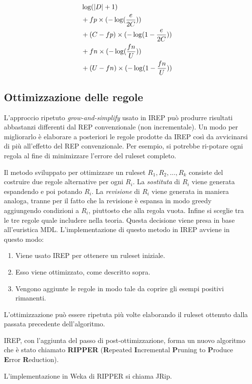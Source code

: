 \begin{align*}
	&\log(|D| + 1) \\
	&+ fp \times (-\log(\dfrac{e}{2C})) \\
	&+ (C - fp) \times (-\log(1 - \-\dfrac{e}{2C})) \\
	&+ fn \times (-\log(\dfrac{fn}{U})) \\
	&+ (U - fn) \times (-\log(1 - \dfrac{fn}{U})) \\	
\end{align*}


\subsection*{Ottimizzazione delle regole}
L'approccio ripetuto \textit{grow-and-simplify} usato in IREP può produrre risultati abbastanzi differenti dal REP convenzionale (non incrementale). Un modo per migliorarlo è elaborare a posteriori le regole prodotte da IREP così da avvicinarsi di più all'effetto del REP convenzionale. Per esempio, si potrebbe ri-potare ogni regola al fine di minimizzare l'errore del ruleset completo.

Il metodo sviluppato per ottimizzare un ruleset $R_1,R_2,...,R_k$ consiste del costruire due regole alternative per ogni $R_i$. La \textit{sostituta} di $R_i$ viene generata espandendo e poi potando $R_i$. La \textit{revisione} di $R_i$ viene generata in maniera analoga, tranne per il fatto che la revisione è espansa in modo greedy aggiungendo condizioni a $R_i$, piuttosto che alla regola vuota. Infine si sceglie tra le tre regole quale includere nella teoria. Questa decisione viene presa in base all'euristica MDL. L'implementazione di questo metodo in IREP avviene in questo modo:
\begin{enumerate}
	\item Viene usato IREP per ottenere un ruleset iniziale.
	\item Esso viene ottimizzato, come descritto sopra.
	\item Vengono aggiunte le regole in modo tale da coprire gli esempi positivi rimanenti.
\end{enumerate}

L'ottimizzazione può essere ripetuta più volte elaborando il ruleset ottenuto dalla passata precedente dell'algoritmo.

IREP, con l'aggiunta del passo di post-ottimizzazione, forma un nuovo algoritmo che è stato chiamato \textbf{RIPPER} (\textbf{R}epeated \textbf{I}ncremental \textbf{P}runing to \textbf{P}roduce \textbf{E}rror \textbf{R}eduction).

L'implementazione in Weka di RIPPER si chiama JRip.